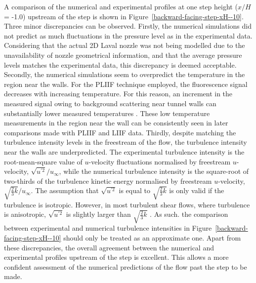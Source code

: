 A comparison of the numerical and experimental profiles at one step height
($x/H$ = -1.0) upstream of the step is shown in Figure~\ref{backward-facing-step-xH--10}.
Three minor discrepancies can be observed. Firstly, the numerical simulations did not
predict as much fluctuations in the pressure level as in the experimental data.
Considering that the actual 2D Laval nozzle was not being modelled due to the 
unavailability of nozzle geometrical information, and that the average pressure
levels matches the experimental data, this discrepancy is deemed acceptable. Secondly,
the numerical simulations seem to overpredict the temperature in the region
near the walls. For the PLIIF technique employed, the fluorescence signal 
decreases with increasing temperature. For this reason, an increment in the measured 
signal owing to background scattering near tunnel walls can substantially lower measured
temperatures \cite{Eklund1995}. These low temperature measurements in the region near the wall
can be consistently seen in later comparisons made with PLIIF and LIIF data. Thirdly,
despite matching the turbulence intensity levels in the freestream of the flow,
the turbulence intensity near the walls are underpredicted. The experimental 
turbulence intensity is the root-mean-square value of $u$-velocity fluctuations
normalised by freestream $u$-velocity, $\sqrt{u^{'2}}/u_{\infty}$, while 
the numerical turbulence intensity is the square-root of two-thirds of the turbulence 
kinetic energy normalised by freestream $u$-velocity, $\sqrt{\frac{2}{3}k}/u_{\infty}$. 
The assumption that $\sqrt{u^{'2}}$ is equal to $\sqrt{\frac{2}{3}k}$ is only valid if
the turbulence is isotropic. However, in most turbulent shear flows, where turbulence
is anisotropic, $\sqrt{u^{'2}}$ is slightly larger than $\sqrt{\frac{2}{3}k}$ \cite{Hinze1975}.
As such. the comparison between experimental and numerical turbulence intensities
in Figure~\ref{backward-facing-step-xH--10} should only be treated as an
approximate one. Apart from these discrepancies, the overall agreement between the
numerical and experimental profiles upstream of the step is excellent. This allows
a more confident assessment of the numerical predictions of the flow past the step
to be made.
%
